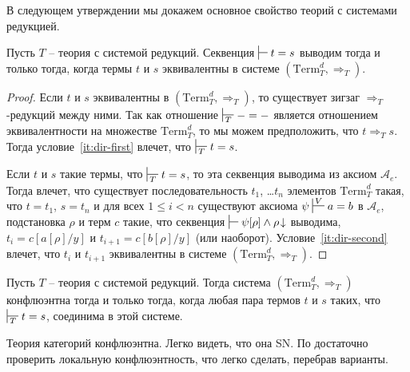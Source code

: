 \documentclass[reqno]{amsart}
\theoremstyle{definition}
\theoremstyle{remark}
\newcommand{\Term}{\mathrm{Term}}
\begin{document}
В следующем утверждении мы докажем основное свойство теорий с системами редукцией.

\begin{prop}
Пусть $T$ -- теория с системой редукций.
Секвенция $\sststile{}{} t = s$ выводим тогда и только тогда, когда термы $t$ и $s$ эквивалентны в системе $(\Term_T^d,\Rightarrow_T)$.
\end{prop}
\begin{proof}
Если $t$ и $s$ эквивалентны в $(\Term_T^d,\Rightarrow_T)$, то существует зигзаг $\Rightarrow_T$-редукций между ними.
Так как отношение $\sststile{T}{} - = -$ является отношением эквивалентности на множестве $\Term_T^d$, то мы можем предположить, что $t \Rightarrow_T s$.
Тогда условие~\eqref{it:dir-first}  влечет, что $\sststile{T}{} t = s$.

Если $t$ и $s$ такие термы, что $\sststile{T}{} t = s$, то эта секвенция выводима из аксиом $\mathcal{A}_e$.
Тогда  влечет, что существует последовательность $t_1$, \ldots $t_n$ элементов $\Term^d_T$ такая, что $t = t_1$, $s = t_n$ и для всех $1 \leq i < n$
существуют аксиома $\psi \sststile{}{V} a = b$ в $\mathcal{A}_e$, подстановка $\rho$ и терм $c$ такие,
что секвенция $\sststile{}{} \psi[\rho] \land \rho\!\downarrow$ выводима, $t_i = c[a[\rho]/y]$ и $t_{i+1} = c[b[\rho]/y]$ (или наоборот).
Условие~\eqref{it:dir-second}  влечет, что $t_i$ и $t_{i+1}$ эквивалентны в системе $(\Term_T^d,\Rightarrow_T)$.
\end{proof}

\begin{cor}
Пусть $T$ -- теория с системой редукций.
Тогда система $(\Term_T^d,\Rightarrow_T)$ конфлюэнтна тогда и только тогда, когда любая пара термов $t$ и $s$ таких, что $\sststile{T}{} t = s$, соединима в этой системе.
\end{cor}

\begin{example}
Теория категорий конфлюэнтна.
Легко видеть, что она SN.
По  достаточно проверить локальную конфлюэнтность, что легко сделать, перебрав варианты.
\end{example}



\end{document}
